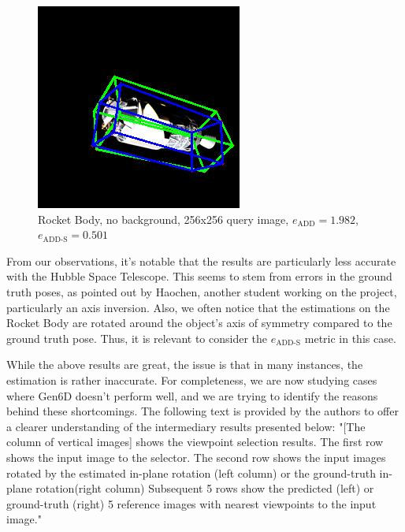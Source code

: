 \begin{figure}[h]
\begin{minipage}{0.45\linewidth}
        \includegraphics[width=\linewidth]{data/fig10.jpg} %
        \caption{Rocket Body, no background, 256x256 query image, $e_\mathrm{ADD}=1.982$, $e_{\mathrm{ADD}\text{-}\mathrm{S}}=0.501$ }
        \label{fig:fig10}
    \end{minipage}
\end{figure}

\bigskip

From our observations, it's notable that the results are particularly less accurate with the Hubble Space Telescope. This seems to stem from errors in the ground truth poses, as pointed out by Haochen, another student working on the project, particularly an axis inversion. Also, we often notice that the estimations on the Rocket Body are rotated around the object's axis of symmetry compared to the ground truth pose. Thus, it is relevant to consider the $e_{\mathrm{ADD}\text{-}\mathrm{S}}$ metric in this case.

\bigskip

\cleardoublepage{}
While the above results are great, the issue is that in many instances, the estimation is rather inaccurate.
For completeness, we are now studying cases where Gen6D doesn't perform well, and we are trying to identify the reasons behind these shortcomings. The following text is provided by the authors to offer a clearer understanding of the intermediary results presented below: "[The column of vertical images] shows the viewpoint selection results. The first row shows the input image to the selector. The second row shows the input images rotated by the estimated in-plane rotation (left column) or the ground-truth in-plane rotation(right column) Subsequent 5 rows show the predicted (left) or ground-truth (right) 5 reference images with nearest viewpoints to the input image."

